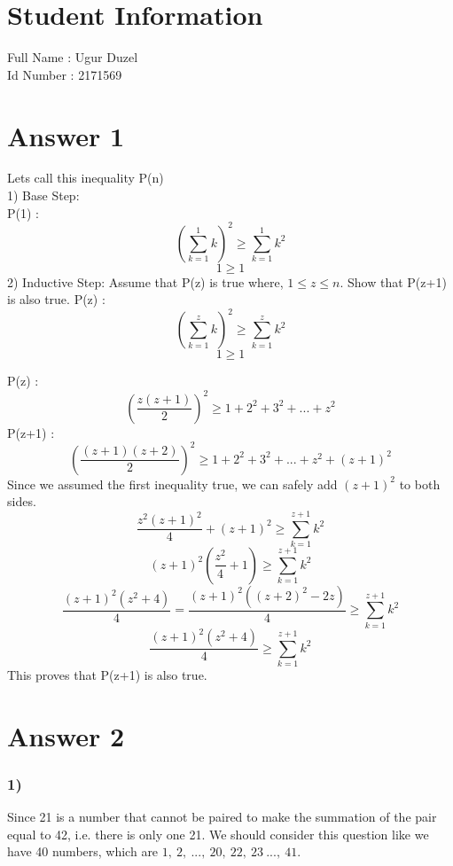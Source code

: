 \documentclass[12pt]{article}
\begin{document}
\section*{Student Information } 
Full Name :  Ugur Duzel\\
Id Number : 2171569 \\

\section*{Answer 1}
\hspace{2cm}Lets call this inequality P(n) \\
1) Base Step: \\
\vspace{0.1cm}
\hspace{5cm}P(1) : $$(\sum\limits_{k=1}^1 k)^2 \geq \sum\limits_{k=1}^1 k^2$$ $$1 \geq 1 $$
2) Inductive Step: Assume that P(z) is true where, $1 \leq z \leq n$. Show that P(z+1) is also true.
\vspace{0.1cm}
\hspace{5cm}P(z) : $$(\sum\limits_{k=1}^z k)^2 \geq \sum\limits_{k=1}^z k^2$$ $$1 \geq 1 $$

P(z) : $$(\frac{z(z+1)}{2})^2 \geq  1+2^2+3^2+...+z^2$$
P(z+1) : $$(\frac{(z+1)(z+2)}{2})^2 \geq  1+2^2+3^2+...+z^2+(z+1)^2$$
Since we assumed the first inequality true, we can safely add $(z+1)^2$ to both sides.
$$ \frac{z^2(z+1)^2}{4}+(z+1)^2 \geq \sum\limits_{k=1}^{z+1} k^2$$
$$ (z+1)^2(\frac{z^2}{4}+1) \geq \sum\limits_{k=1}^{z+1} k^2$$
$$\frac{(z+1)^2(z^2+4)}{4}=\frac{(z+1)^2((z+2)^2-2z)}{4} \geq \sum\limits_{k=1}^{z+1} k^2$$
$$\frac{(z+1)^2(z^2+4)}{4} \geq \sum\limits_{k=1}^{z+1} k^2$$
This proves that P(z+1) is also true.
\section*{Answer 2}
\subsubsection*{1)}
\hspace{1.1cm}Since 21 is a number that cannot be paired to make the summation of the pair equal to 42, i.e. there is only one 21. We should consider this question like we have 40 numbers, which are $1,\ 2,\ ...,\ 20,\ 22,\ 23 \ ...,\ 41$. 
\end{document}
